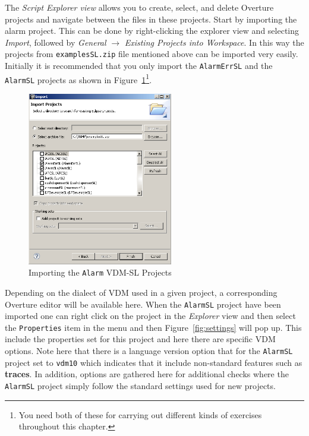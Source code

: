{The \emph{Script Explorer view} allows you to create, select, and
delete Overture projects and navigate between the files in these
projects. Start by importing the alarm project. This can be done by
right-clicking the explorer view and selecting \emph{Import}, followed
by \emph{General} $\rightarrow$ \emph{Existing Projects into
  Workspace}.  In this way the projects from \texttt{examplesSL.zip} file
mentioned above can be imported very easily. Initially it is
recommended that you only import the \texttt{AlarmErrSL} and the
\texttt{AlarmSL} projects as shown in
Figure~\ref{fig:importalarm}\footnote{You need both of these for
  carrying out different kinds of exercises throughout this chapter.}.

\begin{figure}[!htb]
\begin{center}
  \includegraphics[width=2.5in]{figures/importalarm}
  \caption[labelInTOC]{Importing the \texttt{Alarm} VDM-SL Projects}
  \label{fig:importalarm}
\end{center}
\end{figure}

Depending on the dialect of VDM used in a given project, a
corresponding Overture editor will be available here. When the
\texttt{AlarmSL} project have been imported one can right click on the
project in the \emph{Explorer} view and then select the
\texttt{Properties} item in the menu and then
Figure~\ref{fig:settings} will pop up. This include the properties set
for this project and here there are specific VDM options. Note here
that there is a language version option that for the \texttt{AlarmSL}
project set to \texttt{vdm10} which indicates that it include
non-standard features such as {\bf\ttfamily traces}. In addition,
options are gathered here for additional checks where the
\texttt{AlarmSL} project simply follow the standard settings used for
new projects.

}
